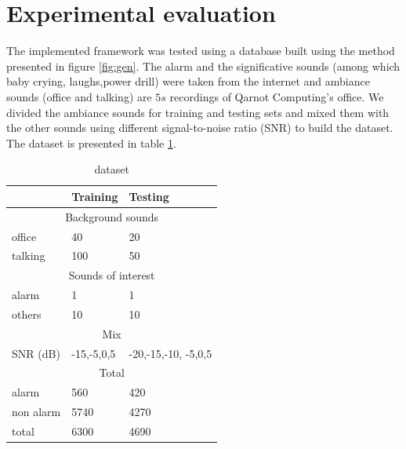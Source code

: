 \documentclass[10pt, conference, compsocconf]{IEEEtran}
\begin{document}
\section{Experimental evaluation} \label{Proof-of-concept}
The implemented framework was tested using a database built using the method presented in figure \ref{fig:gen}. The alarm and the significative sounds (among which baby crying, laughs,power drill) were taken from the internet and ambiance sounds (office and talking) are $5s$ recordings of Qarnot Computing's office. We divided the ambiance sounds for training and testing sets and mixed them with the other sounds using different signal-to-noise ratio (SNR) to build the dataset. The dataset is presented in table \ref{table:dataset}.
\begin{table}[h]
  \centering
  \begin{tabular}{|*{3}{l|}}
    \hline
    & Training & Testing \\
    \hline
    \multicolumn{3}{|c|}{Background sounds} \\
    \hline
    office & 40 & 20\\
    talking & 100 & 50 \\
    \hline
    \multicolumn{3}{|c|}{Sounds of interest} \\
    \hline
    alarm & 1 & 1 \\
    others & 10 & 10 \\
    \hline
    \multicolumn{3}{|c|}{Mix} \\
    \hline
    SNR (dB)& -15,-5,0,5 & -20,-15,-10, -5,0,5 \\
    \hline
    \multicolumn{3}{|c|}{Total} \\ 
    \hline
    alarm & 560 & 420 \\
    non alarm & 5740 & 4270 \\
    total & 6300 & 4690 \\
   \hline
  \end{tabular}
\caption{dataset \label{table:dataset}}
\end{table}
\end{document}
